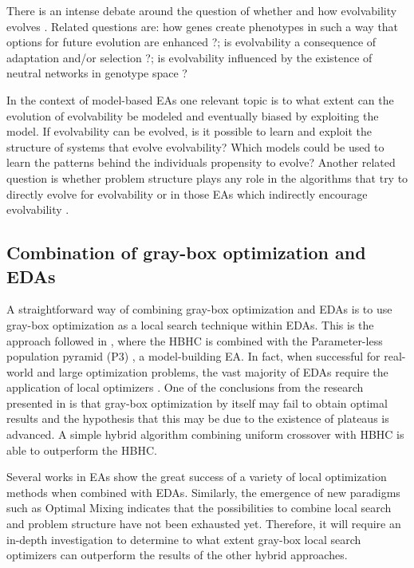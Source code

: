 \documentclass{article} %
\begin{document}
  There is an  intense debate around the question of whether and how evolvability evolves \cite{Brookfield:2001,Earl_and_Deem:2004,Kirschner_and_Gerhart:1998,Radman_et_al:1999}. Related questions are:  how genes create phenotypes in such a way that options for future evolution are enhanced \cite{Brookfield:2001}?; is evolvability a consequence of adaptation and/or selection \cite{Earl_and_Deem:2004,Kirschner_and_Gerhart:1998,Sniegowski_and_Murphy:2006}?; is evolvability influenced by the existence of neutral networks in genotype space \cite{Ebner_et_al:2001}? 

   In the context of model-based EAs one relevant topic is to what extent can the evolution of evolvability be modeled and eventually biased by exploiting the model.  If evolvability can be evolved, is it possible to learn and exploit the structure of systems that evolve evolvability? Which models could be used to learn the patterns behind the individuals propensity to evolve? Another related question is whether problem structure plays any role in the algorithms that try to directly evolve for evolvability or in those EAs which indirectly encourage evolvability  \cite{Kashtan_and_Alon:2005,Lehman_and_Miikkulainen:2015,Lehman_and_Stanley:2011,Mengistu_et_al:2016}. 


\subsection{Combination of gray-box optimization and EDAs}

A straightforward way of combining gray-box optimization and EDAs is to use gray-box optimization as a local search technique within EDAs. This is the approach followed in \cite{Goldman_et_al:2015}, where the HBHC is combined with the Parameter-less population pyramid (P3) \cite{Goldman_and_Punch:2014}, a model-building EA. In fact, when successful for real-world and large optimization problems, the vast majority of EDAs require the application of local optimizers \cite{Muehlenbein_and_Mahnig:2002,Pelikan:2005,Santana_et_al:2008f,Zhang_et_alL2003a}. One of the conclusions from the research presented in  \cite{Goldman_et_al:2015} is that gray-box optimization by itself may fail to obtain optimal results and the hypothesis that this may be due to the existence of plateaus is advanced. A simple hybrid algorithm combining uniform crossover with HBHC is able to outperform the HBHC. 

 Several works  in EAs show the great success of a variety of local optimization methods \cite{Pelikan_et_al:2003a,Radeti_et_al:2009,Santana_et_al:2008f}  when combined with EDAs. Similarly, the emergence of new paradigms such as Optimal Mixing indicates that the possibilities to combine local search and  problem structure have not been exhausted yet. Therefore, it will require an in-depth investigation to determine to what extent  gray-box local search optimizers can outperform the results of the other hybrid approaches. 
\end{document}
